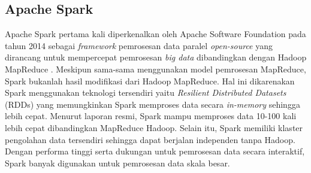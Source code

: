 \subsection{Apache Spark}
Apache Spark pertama kali diperkenalkan oleh Apache Software Foundation pada tahun 2014 sebagai \textit{framework} pemrosesan data paralel \textit{open-source} yang dirancang untuk mempercepat pemrosesan \textit{big data} dibandingkan dengan  Hadoop MapReduce \cite{ApacheSparkUnified}. Meskipun sama-sama menggunakan model pemrosesan MapReduce, Spark bukanlah hasil modifikasi dari Hadoop MapReduce\cite{KOMPARASIKECEPATANHADOOP}. Hal ini dikarenakan Spark menggunakan teknologi tersendiri yaitu \textit{Resilient Distributed Datasets} (RDDs) yang memungkinkan Spark memproses data secara \textit{in-memory} sehingga lebih cepat. Menurut laporan resmi, Spark mampu memproses data 10-100 kali lebih cepat dibandingkan MapReduce Hadoop. Selain itu, Spark memiliki klaster pengolahan data tersendiri sehingga dapat berjalan independen tanpa Hadoop. Dengan performa tinggi serta dukungan untuk pemrosesan data secara interaktif, Spark banyak digunakan untuk pemrosesan data skala besar.

